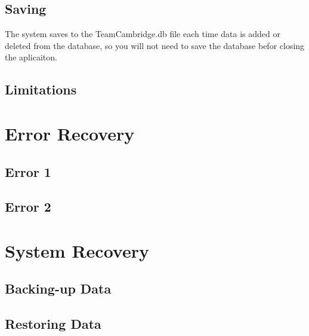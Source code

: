 \subsection{Saving}
The system saves to the TeamCambridge.db file each time data is added or deleted from the database, so you will not need to save the database befor closing the aplicaiton.
\subsection{Limitations}

\section{Error Recovery}

\subsection{Error 1}

\subsection{Error 2}

\section{System Recovery}

\subsection{Backing-up Data}

\subsection{Restoring Data}
